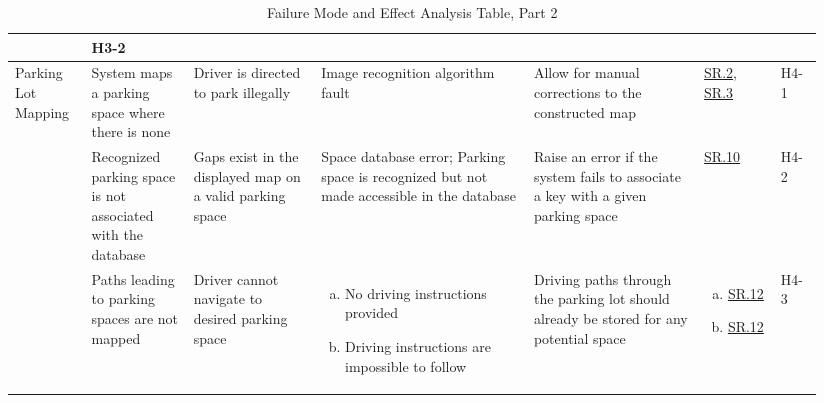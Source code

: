 \documentclass[12pt,letterpaper]{article}
\begin{document}
\begin{landscape}
\begin{table}[hp]
\begin{tabular}{|p{0.09\linewidth}|p{0.12\linewidth}|p{0.15\linewidth}|p{0.25\linewidth}|p{0.2\linewidth}|p{0.075\linewidth}|p{0.05\linewidth}|}
\begin{enumerate}[a., leftmargin=0.5cm, noitemsep,
nolistsep]
\end{enumerate}& H3-2\\
\hline
Parking Lot Mapping & System maps a parking space where there is none & Driver
is directed to park illegally & Image recognition algorithm fault & Allow for
manual corrections to the constructed map & \hyperref[asr2]{SR.2},
\hyperref[asr3]{SR.3} & H4-1\\\cline{2-7} & Recognized parking space is not
associated with the database & Gaps exist in the displayed map on a valid
parking space & Space database error; Parking space is recognized but not made
accessible in the database & Raise an error if the system fails to associate a
key with a given parking space & \hyperref[isr10]{SR.10} & H4-2\\\cline{2-7} &
Paths leading to parking spaces are not mapped & Driver cannot navigate to
desired parking space & \begin{enumerate}[a., leftmargin=0.5cm, noitemsep,
nolistsep] \item No driving instructions provided \item Driving instructions are
impossible to follow \end{enumerate} & Driving paths through the parking lot
should already be stored for any potential space & \begin{enumerate}[a.,
leftmargin=0.5cm, noitemsep, nolistsep]\item \hyperref[isr12]{SR.12} \item
\hyperref[isr12]{SR.12}\end{enumerate}& H4-3\\
\hline
\end{tabular}
\caption{Failure Mode and Effect Analysis Table, Part 2} \label{TblFMEA2}
\end{table}


\end{landscape}
\end{document}
